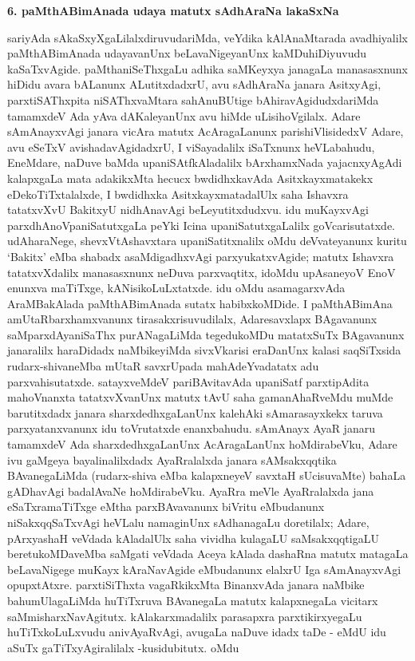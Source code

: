 \bigskip
\begin{center}
{\Large\bf 6. paMthABimAnada udaya matutx sAdhAraNa lakaSxNa}
\end{center}

sariyAda sAkaSxyXgaLilalxdiruvudariMda, veYdika kAlAnaMtarada avadhiyalilx paMthABimAnada udayavanUnx beLavaNigeyanUnx kaMDuhiDiyuvudu kaSaTxvAgide. paMthaniSeThxgaLu adhika saMKeyxya janagaLa manasasxnunx hiDidu avara bALanunx ALutitxdadxrU, avu sAdhAraNa janara AsitxyAgi, parxtiSAThxpita niSAThxvaMtara sahAnuBUtige bAhiravAgidudx\-dariMda tamamxdeV Ada yAva dAKaleyanUnx avu hiMde uLisihoVgilalx. Adare sAmAnayxvAgi janara vicAra matutx AcAragaLanunx parishiVlisidedxV Adare, avu eSeTxV avishadavAgidadxrU, I viSayadalilx iSaTxnunx heVLabahudu, EneMdare, naDuve baMda upaniSAtfkAladalilx bArxhamxNada yajacnxyAgAdi kalapxgaLa mata adakikxMta hecucx bwdidhxka\-vAda Asitxkayxmatakekx eDekoTiTxtalalxde, I bwdidhxka AsitxkayxmatadalUlx saha Ishavxra tatatxvXvU BakitxyU nidhAnavAgi beLeyutitxdudxvu. idu muKayxvAgi parxdhAnoVpaniSatutxgaLa peYki Icina upaniSatutxgaLalilx goVcarisutatxde. udAharaNege, shevxVtAshavxtara upaniSatitxnalilx oMdu deVvateyanunx kuritu `Bakitx' eMba shabadx asaMdigadhxvAgi parxyukatxvAgide; matutx Ishavxra tatatxvXdalilx manasasxnunx neDuva parxvaqtitx, idoMdu upAsaneyoV EnoV enunxva maTiTxge, kANisikoLuLxtatxde. idu oMdu asamagarxvAda AraMBakAlada paMthABimAnada sutatx habibxkoMDide. I paMthABimAna amUtaRbarxhamxvanunx tirasakxrisuvudilalx, Adare\break savxlapx BAgavanunx saMparxdAyaniSaThx purANagaLiMda tegedukoMDu matatxSuTx BAgavanunx jana\-ralilx haraDidadx naMbikeyiMda sivxVkarisi eraDanUnx kalasi saqSiTxsida rudarx-shivaneMba \hbox{mUtaR} savxrUpada mahAdeYvadatatx adu parxvahisutatxde. satayxveMdeV pariBAvitavAda upaniSatf parxtipAdita mahoVnanxta tatatxvXvanUnx matutx tAvU saha gamanAhaRveMdu muMde baru\-titxdadx janara sharxdedhxgaLanUnx kalehAki sAmarasayxkekx taruva parxyatanxvanunx idu toVrutatxde enanxbahudu. sAmAnayx AyaR janaru tamamxdeV Ada sharxdedhxgaLanUnx AcAragaLanUnx hoMdirabeVku, Adare ivu gaMgeya bayalinalilxdadx AyaRralalxda janara sAMsakxqqtika BAvanegaLiMda (rudarx-shiva eMba kalapxneyeV savxtaH sUcisuvaMte) bahaLa gADhavAgi badalAvaNe hoMdirabeVku. AyaRra meVle AyaRralalxda jana eSaTxramaTiTxge eMtha parxBAvavanunx biVritu eMbudanunx niSakxqqSaTxvAgi heVLalu namaginUnx sAdhanagaLu dore\-tilalx; Adare, pArxyashaH veVdada kAladalUlx saha vividha kulagaLU saMsakxqqtigaLU beretu\-koMDaveMba saMgati veVdada Aceya kAlada dashaRna matutx matagaLa beLavaNigege muKayx kAraNavAgide eMbudanunx elalxrU Iga sAmAnayxvAgi opupxtAtxre. parxtiSiThxta vagaRkikxMta BinanxvAda janara naMbike bahumUlagaLiMda huTiTxruva BAvanegaLa matutx kalapxnegaLa vicitarx saMmisharxNavAgitutx. kAlakarxmadalilx parasapxra parxtikirxyegaLu huTiTxkoLuLxvudu ani\-vAyaRvAgi, avugaLa naDuve idadx taDe - eMdU idu aSuTx gaTiTxyAgiralilalx -kusidubitutx. oMdu 